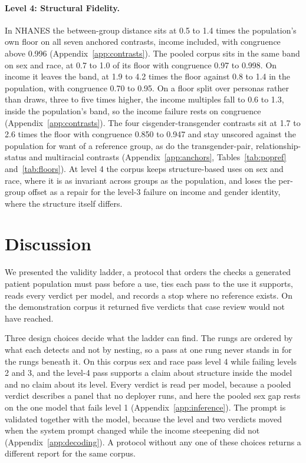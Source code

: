 \documentclass[wcp]{jmlr}
\begin{document}
\paragraph{Level 4: Structural Fidelity.}
\label{sec:structure}
In NHANES the between-group distance sits at 0.5 to 1.4 times the population's own floor on all seven anchored contrasts, income included, with congruence above 0.996 (Appendix~\ref{app:contrasts}). The pooled corpus sits in the same band on sex and race, at 0.7 to 1.0 of its floor with congruence 0.97 to 0.998. On income it leaves the band, at 1.9 to 4.2 times the floor against 0.8 to 1.4 in the population, with congruence 0.70 to 0.95. On a floor split over personas rather than draws, three to five times higher, the income multiples fall to 0.6 to 1.3, inside the population's band, so the income failure rests on congruence (Appendix~\ref{app:contrasts}). \label{sec:trans} The four cisgender-transgender contrasts sit at 1.7 to 2.6 times the floor with congruence 0.850 to 0.947 and stay unscored against the population for want of a reference group, as do the transgender-pair, relationship-status and multiracial contrasts (Appendix~\ref{app:anchors}, Tables~\ref{tab:popref} and~\ref{tab:floors}). At level 4 the corpus keeps structure-based uses on sex and race, where it is as invariant across groups as the population, and loses the per-group offset as a repair for the level-3 failure on income and gender identity, where the structure itself differs.

\section{Discussion}
\label{sec:discussion}

We presented the validity ladder, a protocol that orders the checks a generated patient population must pass before a use, ties each pass to the use it supports, reads every verdict per model, and records a stop where no reference exists. On the demonstration corpus it returned five verdicts that case review would not have reached.

Three design choices decide what the ladder can find. The rungs are ordered by what each detects and not by nesting, so a pass at one rung never stands in for the rungs beneath it. On this corpus sex and race pass level 4 while failing levels 2 and 3, and the level-4 pass supports a claim about structure inside the model and no claim about its level. Every verdict is read per model, because a pooled verdict describes a panel that no deployer runs, and here the pooled sex gap rests on the one model that fails level 1 (Appendix~\ref{app:inference}). The prompt is validated together with the model, because the level and two verdicts moved when the system prompt changed while the income steepening did not (Appendix~\ref{app:decoding}). A protocol without any one of these choices returns a different report for the same corpus.
\end{document}
